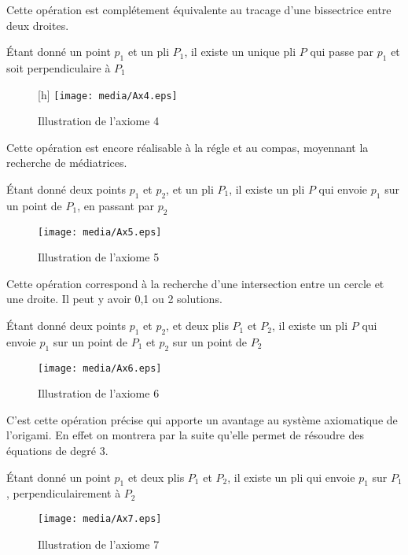 \documentclass[a4paper,12pt,french,draft]{report}
\begin{document}
		Cette opération est complétement équivalente au tracage d'une bissectrice entre deux droites.
		\begin{axiome}[4]
			Étant donné un point $p_{1}$ et un pli $P_{1}$, il existe un unique pli $P$ qui passe par $p_{1}$ et soit perpendiculaire à $P_{1}$
		\end{axiome}
		
		\begin{figure}
		    \begin{center}[h]
			\texttt{[image: media/Ax4.eps]}
		    \end{center}
			\caption{Illustration de l'axiome 4}
		\end{figure}
		Cette opération est encore réalisable à la régle et au compas, moyennant la recherche de médiatrices.
		\begin{axiome}[5]
			Étant donné deux points $p_{1}$ et $p_{2}$, et un pli $P_{1}$, il existe un pli $P$ qui envoie $p_{1}$ sur un point de $P_{1}$, en passant par $p_{2}$
		\end{axiome}
		\begin{figure}[h]
		    \begin{center}
			\texttt{[image: media/Ax5.eps]}
		    \end{center}
			\caption{Illustration de l'axiome 5}
		\end{figure}
		Cette opération correspond à la recherche d'une intersection entre un cercle et une droite. Il peut y avoir 0,1 ou 2 solutions.
		
		
		\begin{axiome}[6]
			Étant donné deux points $p_{1}$ et $p_{2}$, et deux plis $P_{1}$ et $P_{2}$, il existe un pli $P$ qui envoie $p_{1}$ sur un point de $P_{1}$ et $p_{2}$ sur un point de $P_{2}$
		\end{axiome}
		\begin{figure}[h]
		    \begin{center}
			\texttt{[image: media/Ax6.eps]}
		    \end{center}
			\caption{Illustration de l'axiome 6}
		\end{figure}
		 C'est cette opération précise qui apporte un avantage au système axiomatique de l'origami. En effet on montrera par la suite qu'elle permet de résoudre des équations de degré 3.
		
		
		\begin{axiome}[7]
			Étant donné un point $p_{1}$ et deux plis $P_{1}$ et $P_{2}$, il existe un pli qui envoie $p_{1}$ sur $P_{1}$, perpendiculairement à $P_{2}$
		\end{axiome}
		\begin{figure}[h]
		    \begin{center}
			\texttt{[image: media/Ax7.eps]}
		    \end{center}
			\caption{Illustration de l'axiome 7}
		\end{figure}
		
\end{document}
